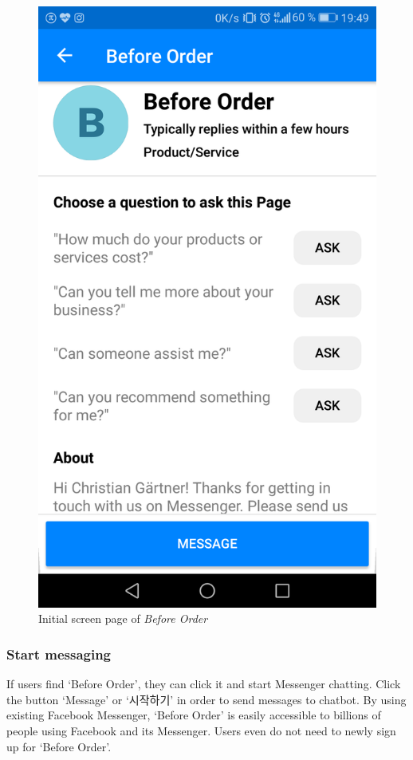 \begin{figure}[htbp]
\centerline{\includegraphics[height=\custompicheight]{./pictures/Screenshot_20181125-194938}}
\caption{Initial screen page of \emph{Before Order}}
\label{fig:Before Order_initial_screen}
\end{figure}
\FloatBarrier
\subsubsection{Start messaging}
 If users find ‘Before Order’, they can click it and start Messenger chatting. Click the button ‘Message’ or ‘시작하기’ in order to send messages to chatbot. By using existing Facebook Messenger, ‘Before Order’ is easily accessible to billions of people using Facebook and its Messenger. Users even do not need to newly sign up for ‘Before Order’.



